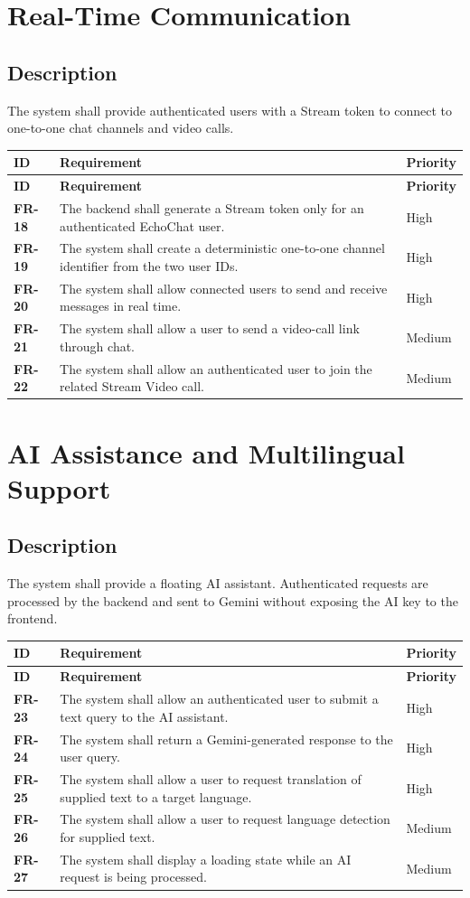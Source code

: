 \documentclass[12pt,a4paper]{report}
\newcommand{\req}[3]{\textbf{#1} & #2 & #3 \\ \hline}
\begin{document}
\section{Real-Time Communication}
\subsection{Description}
The system shall provide authenticated users with a Stream token to connect to one-to-one chat channels and video calls.

\begin{longtable}{|p{1.0in}|p{3.4in}|p{1.5in}|}
\hline
\rowcolor{gray!25}\textbf{ID} & \textbf{Requirement} & \textbf{Priority} \\ \hline
\endfirsthead
\hline
\rowcolor{gray!25}\textbf{ID} & \textbf{Requirement} & \textbf{Priority} \\ \hline
\endhead
\req{FR-18}{The backend shall generate a Stream token only for an authenticated EchoChat user.}{High}
\req{FR-19}{The system shall create a deterministic one-to-one channel identifier from the two user IDs.}{High}
\req{FR-20}{The system shall allow connected users to send and receive messages in real time.}{High}
\req{FR-21}{The system shall allow a user to send a video-call link through chat.}{Medium}
\req{FR-22}{The system shall allow an authenticated user to join the related Stream Video call.}{Medium}
\end{longtable}

\section{AI Assistance and Multilingual Support}
\subsection{Description}
The system shall provide a floating AI assistant. Authenticated requests are processed by the backend and sent to Gemini without exposing the AI key to the frontend.

\begin{longtable}{|p{1.0in}|p{3.4in}|p{1.5in}|}
\hline
\rowcolor{gray!25}\textbf{ID} & \textbf{Requirement} & \textbf{Priority} \\ \hline
\endfirsthead
\hline
\rowcolor{gray!25}\textbf{ID} & \textbf{Requirement} & \textbf{Priority} \\ \hline
\endhead
\req{FR-23}{The system shall allow an authenticated user to submit a text query to the AI assistant.}{High}
\req{FR-24}{The system shall return a Gemini-generated response to the user query.}{High}
\req{FR-25}{The system shall allow a user to request translation of supplied text to a target language.}{High}
\req{FR-26}{The system shall allow a user to request language detection for supplied text.}{Medium}
\req{FR-27}{The system shall display a loading state while an AI request is being processed.}{Medium}
\end{longtable}
\end{document}
